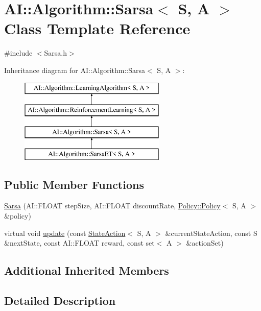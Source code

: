 \hypertarget{classAI_1_1Algorithm_1_1Sarsa}{\section{A\-I\-:\-:Algorithm\-:\-:Sarsa$<$ S, A $>$ Class Template Reference}
\label{classAI_1_1Algorithm_1_1Sarsa}
}


{\ttfamily \#include $<$Sarsa.\-h$>$}

Inheritance diagram for A\-I\-:\-:Algorithm\-:\-:Sarsa$<$ S, A $>$\-:\begin{figure}[H]
\begin{center}
\leavevmode
\includegraphics[height=4.000000cm]{classAI_1_1Algorithm_1_1Sarsa}
\end{center}
\end{figure}
\subsection*{Public Member Functions}
\begin{DoxyCompactItemize}
\item 
\hyperlink{classAI_1_1Algorithm_1_1Sarsa_a02dae564a53ea2284a23d047a8998fca}{Sarsa} (A\-I\-::\-F\-L\-O\-A\-T step\-Size, A\-I\-::\-F\-L\-O\-A\-T discount\-Rate, \hyperlink{classAI_1_1Algorithm_1_1Policy_1_1Policy}{Policy\-::\-Policy}$<$ S, A $>$ \&policy)
\item 
virtual void \hyperlink{classAI_1_1Algorithm_1_1Sarsa_ae1d62478d3e31cace3fb594e05f83d1c}{update} (const \hyperlink{classAI_1_1StateAction}{State\-Action}$<$ S, A $>$ \&current\-State\-Action, const S \&next\-State, const A\-I\-::\-F\-L\-O\-A\-T reward, const set$<$ A $>$ \&action\-Set)
\end{DoxyCompactItemize}
\subsection*{Additional Inherited Members}


\subsection{Detailed Description}
